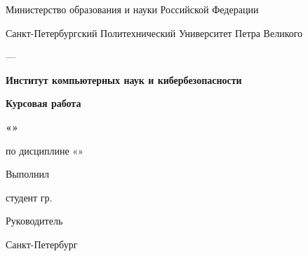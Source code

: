 \begin{titlepage}
\singlespacing
\centering
Министерство образования и науки Российской Федерации\par
Санкт-Петербургский Политехнический Университет Петра Великого\par
---\par
\textbf{Институт компьютерных наук и кибербезопасности}\par
\vspace{6.5cm}
\textbf{Курсовая работа}\par
\vspace{\baselineskip}
\textbf{«\reporttitle»}\par
\vspace{\baselineskip}
по дисциплине «\reportdiscipline»\par
\vspace{3.5cm}
\raggedright
\hspace*{1cm}Выполнил\par
\vspace{10pt}
\hspace*{2cm}студент гр. \reportgroup\hfill\makebox[4.9cm][l]{\reportauthor}\par
\vspace{1.4cm}
\hspace*{1cm}Руководитель\par
\vspace{10pt}
\hspace*{1cm}\reportsupervisorrank\hfill\makebox[4.9cm][l]{\reportsupervisor}\par
\vfill
\centering
Санкт-Петербург\par
\reportyear\par
\end{titlepage}
\setcounter{page}{2}
